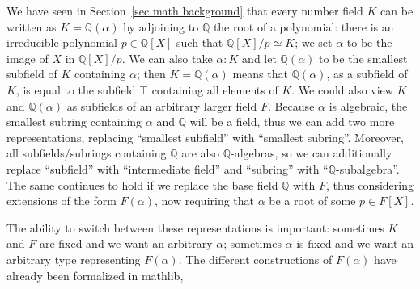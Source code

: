\documentclass[a4paper,USenglish,cleveref, autoref, thm-restate]{lipics-v2021}
\newcommand{\lean}[1]{\texttt{#1}\xspace} %
\newcommand{\mathlib}{\textsf{mathlib}\xspace}
\newcommand{\Q}{\mathbb{Q}}
\begin{document}
We have seen in Section~\ref{sec math background} that every number field $K$ can be written as
$K=\Q(\alpha)$ by adjoining to $\Q$ the root of a polynomial: there is an irreducible polynomial $p \in \Q[X]$ such that $\Q[X] / p \simeq K$; we set $\alpha$ to be the image of $X$ in $\Q[X] / p$.
We can also take $\alpha : K$ and let $\Q(\alpha)$ to be the smallest subfield of $K$ containing $\alpha$; %
then $K = \Q(\alpha)$ means that $\Q(\alpha)$, as a subfield of $K$, is equal to the subfield $\top$ containing all elements of $K$.
We could also view $K$ and $\Q(\alpha)$ as subfields of an arbitrary larger field $F$.
Because $\alpha$ is algebraic, the smallest subring containing $\alpha$ and $\Q$ will be a field, thus we can add two more representations, replacing ``smallest subfield'' with ``smallest subring''.
Moreover, all subfields/subrings containing $\Q$ are also $\Q$-algebras, so we can additionally replace ``subfield'' with ``intermediate field'' and ``subring'' with ``$\Q$-subalgebra''. The same continues to hold if we replace the base field $\Q$ with $F$, thus considering extensions of the form $F(\alpha)$, now requiring that $\alpha$ be a root of some $p\in F[X]$.

The ability to switch between these representations is important: sometimes $K$ and $F$ are fixed and we want an arbitrary $\alpha$; sometimes $\alpha$ is fixed and we want an arbitrary type representing $F(\alpha)$. The different constructions of $F(\alpha)$ have already been formalized in \mathlib,
\end{document}
